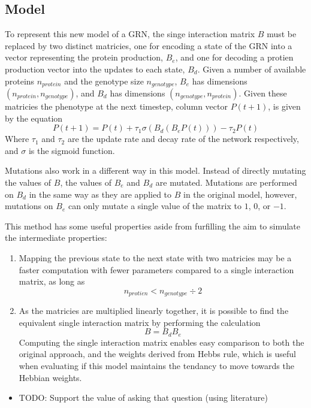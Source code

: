 \documentclass[twocolumn,a4paper]{article}
\begin{document}
    \subsection{Model}
    To represent this new model of a GRN, the singe interaction matrix $B$ must be replaced by two distinct matricies, one for encoding a state of the GRN into a vector representing the protein production, $B_e$, and one for decoding a protien production vector into the updates to each state, $B_d$. Given a number of available proteins $n_{protein}$ and the genotype size $n_{genotype}$, $B_e$ has dimensions $(n_{protein},n_{genotype})$, and $B_d$ has dimensions $(n_{genotype},n_{protein})$. Given these matricies the phenotype at the next timestep, column vector $P(t+1)$, is given by the equation
    \begin{equation}
        P(t+1) = P(t) + \tau_1 \sigma (B_d (B_e P(t))) - \tau_2 P(t)
    \end{equation}
    Where $\tau_1$ and $\tau_2$ are the update rate and decay rate of the network respectively, and $\sigma$ is the sigmoid function.

    Mutations also work in a different way in this model. Instead of directly mutating the values of $B$, the values of $B_e$ and $B_d$ are mutated. Mutations are performed on $B_d$ in the same way as they are applied to $B$ in the original model, however, mutations on $B_e$ can only mutate a single value of the matrix to $1$, $0$, or $-1$.

    This method has some useful properties aside from furfilling the aim to simulate the intermediate properties:
    \begin{enumerate}
        \item Mapping the previous state to the next state with two matricies may be a faster computation with fewer parameters compared to a single interaction matrix, as long as
        \begin{equation}
            n_{protien} < n_{genotype} \div 2
        \end{equation}
            
        \item As the matricies are multiplied linearly together, it is possible to find the equivalent single interaction matrix by performing the calculation
        \begin{equation}
            B = B_dB_e
        \end{equation}
        Computing the single interaction matrix enables easy comparison to both the original approach, and the weights derived from Hebbs rule, which is useful when evaluating if this model maintains the tendancy to move towards the Hebbian weights.
    \end{enumerate}
    \begin{itemize}
        \item TODO: Support the value of asking that question (using literature)
    \end{itemize}
\end{document}
